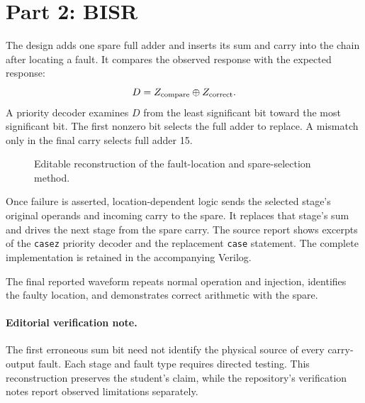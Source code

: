 \documentclass[11pt,a4paper]{article}
\newcommand{\bits}[1]{\texttt{#1}}
\begin{document}
\section{Part 2: BISR}
The design adds one spare full adder and inserts its sum and carry into the chain after locating a fault. It compares the observed response with the expected response:
\[
D=Z_{\rm compare}\oplus Z_{\rm correct}.
\]
A priority decoder examines $D$ from the least significant bit toward the most significant bit. The first nonzero bit selects the full adder to replace. A mismatch only in the final carry selects full adder 15.
\begin{figure}[ht]\centering
{}
\caption{Editable reconstruction of the fault-location and spare-selection method.}
\end{figure}
Once failure is asserted, location-dependent logic sends the selected stage's original operands and incoming carry to the spare. It replaces that stage's sum and drives the next stage from the spare carry.
The source report shows excerpts of the \bits{casez} priority decoder and the replacement \bits{case} statement. The complete implementation is retained in the accompanying Verilog.

The final reported waveform repeats normal operation and injection, identifies the faulty location, and demonstrates correct arithmetic with the spare.
\paragraph{Editorial verification note.}
The first erroneous sum bit need not identify the physical source of every carry-output fault. Each stage and fault type requires directed testing. This reconstruction preserves the student's claim, while the repository's verification notes report observed limitations separately.
\end{document}
